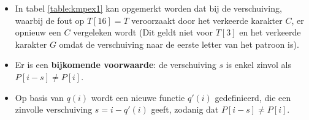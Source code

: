 \begin{itemize}
\begin{itemize}
        \begin{table}[ht]
            \centering   
            \caption{Een eerste versie van het Knuth-Morris-Prattalgoritme, , waarbij $s = i - q(i)$.}
            \label{table:kmpex1}
        \end{table}

    \end{itemize}
    \item In tabel \ref{table:kmpex1} kan opgemerkt worden dat bij de verschuiving, waarbij de fout op $T[16] = T$ veroorzaakt door het verkeerde karakter $C$, er opnieuw een $C$ vergeleken wordt (Dit geldt niet voor $T[3]$ en het verkeerde karakter $G$ omdat de verschuiving naar de eerste letter van het patroon is). 
    \item Er is een \textbf{bijkomende voorwaarde}: de verschuiving $s$ is enkel zinvol als $P[i - s] \neq P[i]$.
    \item Op basis van $q(i)$ wordt een nieuwe functie $q'(i)$ gedefinieerd, die een zinvolle verschuiving $s = i - q'(i)$ geeft, zodanig dat $P[i - s] \neq P[i]$.


\end{itemize}
